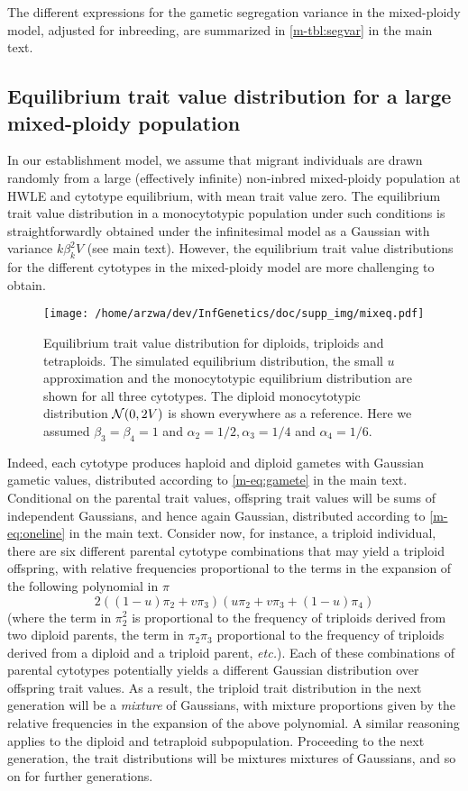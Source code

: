 \documentclass[11pt,a4paper]{article}
\begin{document}
The different expressions for the gametic segregation variance in the
mixed-ploidy model, adjusted for inbreeding, are summarized in
\cref{m-tbl:segvar} in the main text.


\subsection{Equilibrium trait value distribution for a large mixed-ploidy
population \label{sec:mixeq}}

In our establishment model, we assume that migrant individuals are drawn
randomly from a large (effectively infinite) non-inbred mixed-ploidy population
at HWLE and cytotype equilibrium, with mean trait value zero.
The equilibrium trait value distribution in a monocytotypic population
under such conditions is straightforwardly obtained under the infinitesimal
model as a Gaussian with variance $k \beta_k^2 V$ (see main text).
However, the equilibrium trait value distributions for the different cytotypes
in the mixed-ploidy model are more challenging to obtain.

\begin{figure}
\centering
\texttt{[image: /home/arzwa/dev/InfGenetics/doc/supp\_img/mixeq.pdf]}
\caption{
    Equilibrium trait value distribution for diploids, triploids and
    tetraploids.
    The simulated equilibrium distribution, the small $u$ approximation and the
    monocytotypic equilibrium distribution are shown for all three cytotypes.
    The diploid monocytotypic distribution $\mathcal{N}(0,2V)$ is shown everywhere
    as a reference. Here we assumed $\beta_3 = \beta_4 = 1$ and $\alpha_2 =
    1/2, \alpha_3 = 1/4$ and $\alpha_4 = 1/6$.
\label{fig:mixeq}}
\end{figure}

Indeed, each cytotype produces haploid and diploid gametes with Gaussian
gametic values, distributed according to \cref{m-eq:gamete} in the main text.
Conditional on the parental trait values, offspring trait values will be sums
of independent Gaussians, and hence again Gaussian, distributed according to
\cref{m-eq:oneline} in the main text.
Consider now, for instance, a triploid individual, there are six different
parental cytotype combinations that may yield a triploid offspring, with
relative frequencies proportional to the terms in the expansion of the
following polynomial in $\pi$
  $$2((1-u)\pi_2 + v\pi_3)(u\pi_2 + v\pi_3 + (1-u)\pi_4)$$
(where the term in $\pi_2^2$ is proportional to the frequency of triploids
derived from two diploid parents, the term in $\pi_2\pi_3$ proportional to the
frequency of triploids derived from a diploid and a triploid parent,
\textit{etc.}).
Each of these combinations of parental cytotypes potentially yields a different
Gaussian distribution over offspring trait values.
As a result, the triploid trait distribution in the next generation will be a
\textit{mixture} of Gaussians, with mixture proportions given by the relative
frequencies in the expansion of the above polynomial.
A similar reasoning applies to the diploid and tetraploid subpopulation.
Proceeding to the next generation, the trait distributions will be mixtures
mixtures of Gaussians, and so on for further generations.
\end{document}
